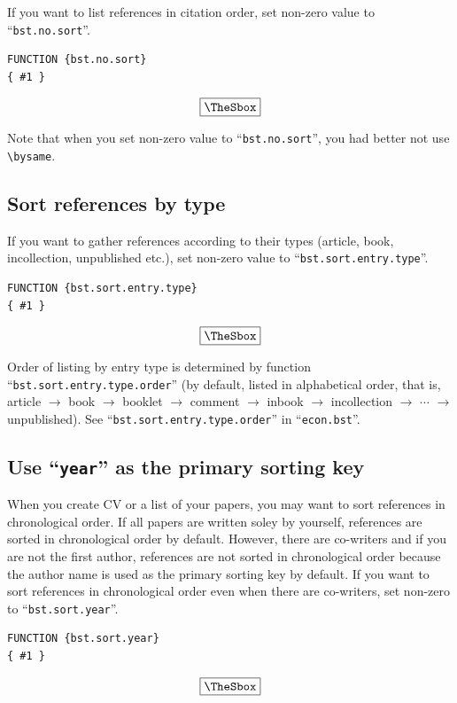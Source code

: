 \documentclass[10pt]{article}
\newenvironment{Frame}%
{\setlength{\fboxsep}{15pt}
\setlength{\mylength}{\linewidth}%
\addtolength{\mylength}{-2\fboxsep}%
\addtolength{\mylength}{-2\fboxrule}%
\Sbox
\minipage{\mylength}%
\setlength{\abovedisplayskip}{0pt}%
\setlength{\belowdisplayskip}{0pt}%
}%
{\endminipage\endSbox
\[\fbox{\TheSbox}\]}
\begin{document}
If you want to list references in citation order, set non-zero value to
``\texttt{bst.no.sort}''.
\begin{Frame}
\begin{verbatim}
FUNCTION {bst.no.sort}
{ #1 }
\end{verbatim}
\end{Frame}

Note that when you set non-zero value to ``\texttt{bst.no.sort}'', you had better not
use \verb|\bysame|.

\subsection{Sort references by type}

If you want to gather references according to their types (article,
book, incollection, unpublished etc.), set non-zero value to
``\texttt{bst.sort.entry.type}''.
\begin{Frame}
\begin{verbatim}
FUNCTION {bst.sort.entry.type}
{ #1 }
\end{verbatim}
\end{Frame}

Order of listing by entry type is determined by function
``\texttt{bst.sort.entry.type.order}'' (by default, listed in alphabetical
order, that is, article $\rightarrow$ book $\rightarrow$ booklet
$\rightarrow$ comment $\rightarrow$ inbook $\rightarrow$ incollection
$\rightarrow$ $\cdots$ $\rightarrow$ unpublished).  See
``\texttt{bst.sort.entry.type.order}'' in ``\texttt{econ.bst}''.

\subsection{Use ``\texttt{year}''  as the primary sorting key}

When you create CV or a list of your papers, you may want to sort
references in chronological order.  If all papers are written soley by
yourself, references are sorted in chronological order by default.
However, there are co-writers and if you are not the first author,
references are not sorted in chronological order because the author name
is used as the primary sorting key by default.
If you want to sort references in chronological order even when
there are co-writers, set non-zero to ``\texttt{bst.sort.year}''.
\begin{Frame}
\begin{verbatim}
FUNCTION {bst.sort.year}
{ #1 }
\end{verbatim}
\end{Frame}
\end{document}

